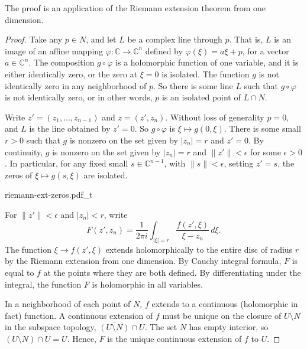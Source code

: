 \documentclass[12pt,openany]{book}
\newcommand{\sabs}[1]{\lvert {#1} \rvert}
\newcommand{\snorm}[1]{\lVert {#1} \rVert}
\newcommand{\abs}[1]{\left\lvert {#1} \right\rvert}
\newcommand{\C}{{\mathbb{C}}}
\theoremstyle{plain}
\theoremstyle{remark}
\theoremstyle{definition}
\newenvironment{myfig}{%
    \begin{center}
}{%
    \end{center}
}
\theoremstyle{exercise}
\theoremstyle{example}
\begin{document}
The proof is an application of the Riemann extension theorem from one dimension.

\begin{proof}
Take any $p \in N$, and let $L$ be a complex line through $p$.
That is,
$L$ is an image of an affine mapping
$\varphi \colon \C \to \C^n$ defined by
$\varphi(\xi) = a\xi + p$, for a vector $a \in \C^n$.
The composition $g \circ \varphi$
is a holomorphic function of one variable, and it
is either identically zero, or
the zero at $\xi=0$ is isolated.
The function $g$ is not identically zero in any neighborhood of $p$.
So there is some line $L$ such that $g \circ \varphi$
is not identically zero, or in other words, $p$
is an isolated point of $L \cap N$.

Write $z' =
(z_1,\ldots,z_{n-1})$ and $z=(z',z_n)$.
Without loss of generality $p = 0$, and $L$ is the line
obtained by $z' = 0$.
So $g \circ \varphi$ is $\xi \mapsto g(0,\xi)$.
There is some small
$r > 0$ such that $g$ is nonzero on the set
given by $\sabs{z_n} = r$ and $z' = 0$.
By continuity,
$g$ is nonzero on the set given by
$\sabs{z_n} = r$ and $\snorm{z'} <\epsilon$ for some $\epsilon >0$.
In particular, for any fixed small $s \in \C^{n-1}$, with $\snorm{s} < \epsilon$,
setting $z' = s$,
the zeros of $\xi \mapsto g(s,\xi)$ are isolated.

\begin{myfig}
{riemann-ext-zeros.pdf_t}
\end{myfig}

For $\snorm{z'} <
\epsilon$ and $\abs{z_n} < r$, write
\begin{equation*}
F(z',z_n) =
\frac{1}{2\pi i}
\int_{\sabs{\xi}=r} \frac{f(z',\xi)}{\xi-z_n} \,d\xi .
\end{equation*}
The function $\xi \to f(z',\xi)$ extends holomorphically to the entire
disc of radius $r$ by the Riemann extension from one dimension.  By Cauchy
integral formula,
$F$ is equal to $f$ at the points where they are both defined.
By differentiating under the integral, the function $F$ is holomorphic
in all variables.

In a neighborhood of each point of 
$N$, $f$ extends to a continuous (holomorphic in fact) function.
A continuous extension of $f$ must be unique
on the closure of
$U \setminus N$ in the subspace topology,
$\overline{(U \setminus N)} \cap U$.  The set $N$ has empty interior,
so $\overline{(U \setminus N)} \cap U = U$.  Hence, $F$ is the unique
continuous extension of $f$ to $U$.
\end{proof}
\end{document}
